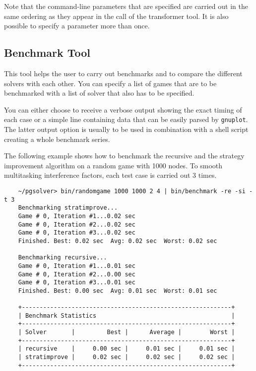 Note that the command-line parameters that are specified are carried out in the same ordering as they
appear in the call of the transformer tool. It is also possible to specify a parameter more than once.


\subsection{Benchmark Tool}

This tool helps the user to carry out benchmarks and to compare the different solvers with each other. 
You can specify a list of games that are to be benchmarked with a list of solver that also has to be 
specified.

You can either choose to receive a verbose output showing the exact timing of each case or a simple line 
containing data that can be easily parsed by \texttt{gnuplot}. The latter output option is usually to be 
used in combination with a shell script creating a whole benchmark series.

\begin{example}
The following example shows how to benchmark the recursive and the strategy improvement algorithm on a 
random game with 1000 nodes. To smooth multitasking interference factors, each test case is carried out 
3 times.
\begin{verbatim}
    ~/pgsolver> bin/randomgame 1000 1000 2 4 | bin/benchmark -re -si -t 3
    Benchmarking stratimprove...
    Game # 0, Iteration #1...0.02 sec
    Game # 0, Iteration #2...0.02 sec
    Game # 0, Iteration #3...0.02 sec
    Finished. Best: 0.02 sec  Avg: 0.02 sec  Worst: 0.02 sec

    Benchmarking recursive...
    Game # 0, Iteration #1...0.01 sec
    Game # 0, Iteration #2...0.00 sec
    Game # 0, Iteration #3...0.01 sec
    Finished. Best: 0.00 sec  Avg: 0.01 sec  Worst: 0.01 sec

    +-----------------------------------------------------------+
    | Benchmark Statistics                                      |
    +-----------------------------------------------------------+
    | Solver       |         Best |      Average |        Worst |
    +-----------------------------------------------------------+
    | recursive    |     0.00 sec |     0.01 sec |     0.01 sec |
    | stratimprove |     0.02 sec |     0.02 sec |     0.02 sec |
    +-----------------------------------------------------------+
\end{verbatim}
\end{example}

